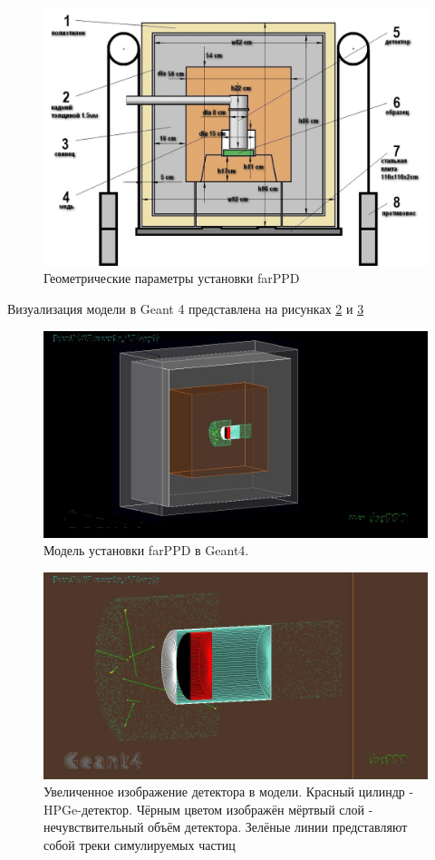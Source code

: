 \documentclass[a4paper,article,14pt]{extarticle}
\begin{document}
\begin{figure}[h]
    \centering
    \includegraphics[width = 0.85 \textwidth]{images/farPPD_size.jpg}
    \caption{Геометрические параметры установки farPPD}
    \label{geom}
\end{figure}

Визуализация модели в Geant 4 представлена на рисунках \ref{vis} и \ref{tracks}

\begin{figure}[h]
    \centering
    \includegraphics[width = 0.85 \textwidth]{images/Visualisation.jpg}
    \caption{Модель установки farPPD в Geant4. }
    \label{vis}
\end{figure}

\begin{figure}[h!]
    \centering
    \includegraphics[width = 0.85 \textwidth]{images/Tracks.jpg}
    \caption{Увеличенное изображение детектора в модели. Красный цилиндр - HPGe-детектор. Чёрным цветом изображён мёртвый слой - нечувствительный объём детектора. Зелёные линии представляют собой треки симулируемых частиц}
    \label{tracks}
\end{figure}
\end{document}
